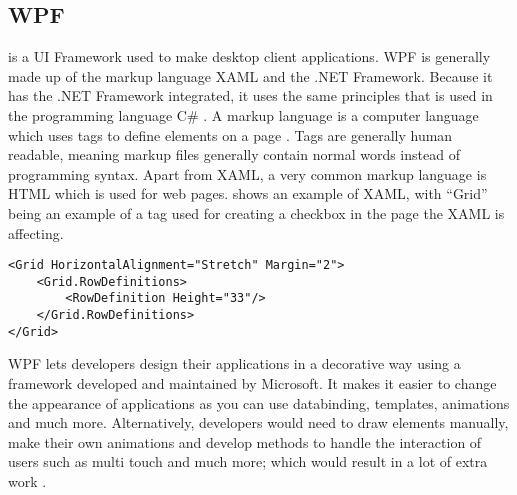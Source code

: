 \subsection{WPF}
 is a UI Framework used to make desktop client applications. WPF is generally made up of the markup language XAML and the .NET Framework. Because it has the .NET Framework integrated, it uses the same principles that is used in the programming language C\# \cite{2015IntroductionDocs}.
A markup language is a computer language which uses tags to define elements on a page \cite{MarkupDefinition}. Tags are generally human readable, meaning markup files generally contain normal words instead of programming syntax. Apart from XAML, a very common markup language is HTML which is used for web pages.  shows an example of XAML, with \enquote{Grid} being an example of a tag used for creating a checkbox in the page the XAML is affecting.

\begin{lstlisting}[style=XMLstyle, numbers=none, xleftmargin=0\textwidth, label=lst:example_of_markup, caption={An example of XAML}]
<Grid HorizontalAlignment="Stretch" Margin="2">
    <Grid.RowDefinitions>
        <RowDefinition Height="33"/>
    </Grid.RowDefinitions>
</Grid>
\end{lstlisting}

\noindent
WPF lets developers design their applications in a decorative way using a framework developed and maintained by Microsoft. It makes it easier to change the appearance of applications as you can use databinding, templates, animations and much more. Alternatively, developers would need to draw elements manually, make their own animations and develop methods to handle the interaction of users such as multi touch and much more; which would result in a lot of extra work \cite{WPFOverview}. 

